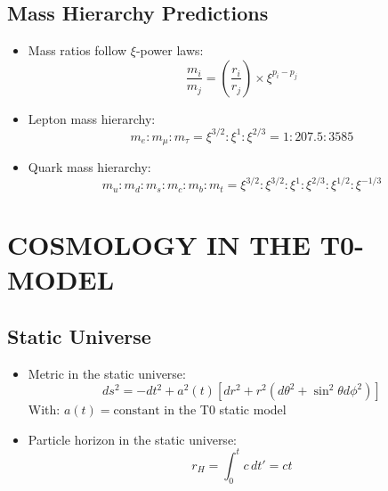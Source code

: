 \documentclass[12pt,a4paper]{article}
\begin{document}
\subsection{Mass Hierarchy Predictions}
\begin{itemize}
	\item Mass ratios follow $\xi$-power laws:
	\begin{equation}
		\frac{m_i}{m_j} = \left(\frac{r_i}{r_j}\right) \times \xi^{p_i - p_j}
	\end{equation}
	
	\item Lepton mass hierarchy:
	\begin{equation}
		m_e : m_\mu : m_\tau = \xi^{3/2} : \xi^1 : \xi^{2/3} = 1 : 207.5 : 3585
	\end{equation}
	
	\item Quark mass hierarchy:
	\begin{equation}
		m_u : m_d : m_s : m_c : m_b : m_t = \xi^{3/2} : \xi^{3/2} : \xi^1 : \xi^{2/3} : \xi^{1/2} : \xi^{-1/3}
	\end{equation}
\end{itemize}	
	\section{COSMOLOGY IN THE T0-MODEL}
	
	\subsection{Static Universe}
	\begin{itemize}
		\item Metric in the static universe:
		\begin{equation}
			ds^2 = -dt^2 + a^2(t)[dr^2 + r^2(d\theta^2 + \sin^2\theta d\phi^2)]
		\end{equation}
		With: $a(t) = \text{constant}$ in the T0 static model
		
		\item Particle horizon in the static universe:
		\begin{equation}
			r_H = \int_0^t c \, dt' = ct
		\end{equation}
	\end{itemize}
	
\end{document}
